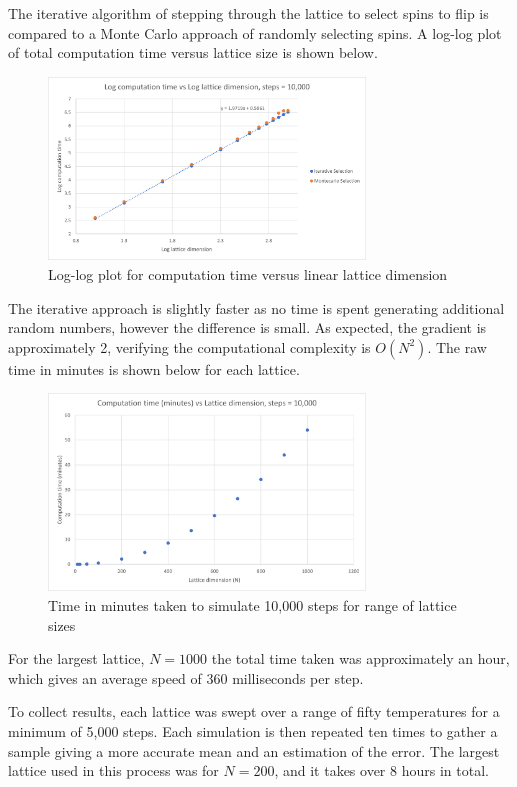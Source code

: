 \documentclass[a4paper, 12pt]{article}
\begin{document}
The iterative algorithm of stepping through the lattice to select spins to flip is compared to a Monte Carlo approach of randomly selecting spins. A log-log plot of total computation time versus lattice size is shown below.
\begin{figure}[H]
\centering
\includegraphics[width=0.75\textwidth]{./resources/log_computation_time.png}
\caption{Log-log plot for computation time versus linear lattice dimension}
\end{figure}

The iterative approach is slightly faster as no time is spent generating additional random numbers, however the difference is small. As expected, the gradient is approximately 2, verifying the computational complexity is \( O(N^2) \). The raw time in minutes is shown below for each lattice. 

\begin{figure}[H]
\centering
\includegraphics[width=0.75\textwidth]{./resources/raw_computation_time.png}
\caption{Time in minutes taken to simulate 10,000 steps for range of lattice sizes}
\end{figure}

For the largest lattice, \(N=1000\) the total time taken was approximately an hour, which gives an average speed of 360 milliseconds per step. 

To collect results, each lattice was swept over a range of fifty temperatures for a minimum of 5,000 steps. Each simulation is then repeated ten times to gather a sample giving a more accurate mean and an estimation of the error. The largest lattice used in this process was for \( N= 200 \), and it takes over 8 hours in total.
\end{document}
